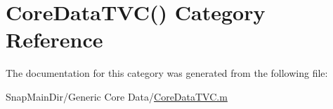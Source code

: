 \hypertarget{category_core_data_t_v_c_07_08}{}\section{Core\+Data\+T\+VC() Category Reference}
\label{category_core_data_t_v_c_07_08}


The documentation for this category was generated from the following file\+:\begin{DoxyCompactItemize}
\item 
Snap\+Main\+Dir/\+Generic Core Data/\hyperlink{_core_data_t_v_c_8m}{Core\+Data\+T\+V\+C.\+m}\end{DoxyCompactItemize}
